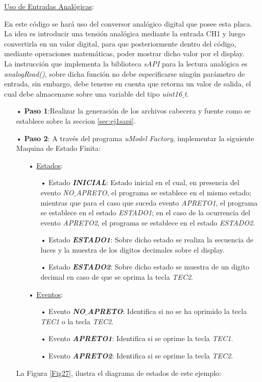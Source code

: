 \documentclass[12pt,letterpaper]{article}
\begin{document}
\underline{Uso de Entradas Analógicas}:

En este código se hará uso del conversor analógico digital que posee esta placa. La idea es introducir una tensión analógica mediante la entrada CH1 y luego convertirla en un valor digital, para que posteriormente dentro del código, mediante operaciones matemáticas, poder mostrar dicho valor por el display.
 \\
 
La instrucción que implementa la biblioteca \textit{sAPI} para la lectura analógica es \textit{analogRead()}, sobre dicha función no debe especificarse ningún parámetro de entrada, sin embargo, debe tenerse en cuenta que retorna un valor de salida, el cual debe almacenarse sobre una variable del tipo \textit{uint16$\_$t}.

\begin{enumerate}
\item[•]\textbf{Paso 1}:Realizar la generación de los archivos cabecera y fuente como se establece sobre la seccion \ref{sec:ej1sapi}.

\item[•]\textbf{Paso 2}: A través del programa \textit{uModel Factory}, implementar la siguiente Maquina de Estado Finita:

\begin{enumerate}
\item[•]\underline{Estados}:
\begin{enumerate}
\item[•]Estado \textit{\textbf{INICIAL}}: Estado inicial en el cual, en presencia del evento \textit{NO$\_$APRETO}, el programa se establece en el mismo estado; mientras que para el caso que suceda evento \textit{APRETO1}, el programa se establece en el estado \textit{ESTADO1}; en el caso de la ocurrencia del evento \textit{APRETO2}, el programa se establece en el estado \textit{ESTADO2}. 
\item[•]Estado \textit{\textbf{ESTADO1}}: Sobre dicho estado se realiza la secuencia de luces y la muestra de los digitos decimales sobre el display.
\item[•]Estado \textit{\textbf{ESTADO2}}: Sobre dicho estado se muestra de un digito decimal en caso de que se oprima la tecla \textit{TEC2}.
\end{enumerate}
\item[•]\underline{Eventos}:
\begin{enumerate}
\item[•]Evento \textit{\textbf{NO$\_$APRETO}}: Identifica si no se ha oprimido la tecla \textit{TEC1} o la tecla \textit{TEC2}.
\item[•]Evento \textit{\textbf{APRETO1}}: Identifica si se oprime la tecla \textit{TEC1}.
\item[•]Evento \textit{\textbf{APRETO2}}: Identifica si se oprime la tecla \textit{TEC2}.
\end{enumerate}
\end{enumerate}
La Figura \ref{Fig27}, ilustra el diagrama de estados de este ejemplo:



\end{enumerate}
\end{document}
